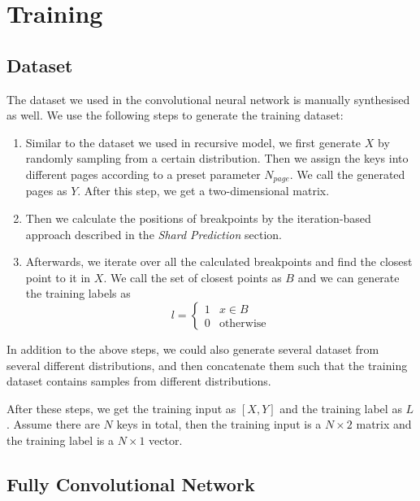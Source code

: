 \section{Training}

\subsection{Dataset}

The dataset we used in the convolutional neural network is manually synthesised as well. We use the following steps to generate the training dataset:

\begin{enumerate}
	\item Similar to the dataset we used in recursive model, we first generate $X$ by randomly sampling from a certain distribution. Then we assign the keys into different pages according to a preset parameter $N_{page}$. We call the generated pages as $Y$. After this step, we get a two-dimensional matrix.
	\item Then we calculate the positions of breakpoints by the iteration-based approach described in the \textit{Shard Prediction} section.
	\item Afterwards, we iterate over all the calculated breakpoints and find the closest point to it in $X$. We call the set of closest points as $B$ and we can generate the training labels as
	\begin{equation}
		l=\begin{cases}
			1 & x\in B \\
			0 & \text{otherwise} 
		\end{cases}
	\end{equation}
\end{enumerate}

In addition to the above steps, we could also generate several dataset from several different distributions, and then concatenate them such that the training dataset contains samples from different distributions.

After these steps, we get the training input as $[X, Y]$ and the training label as $L$. Assume there are $N$ keys in total, then the training input is a $N\times 2$ matrix and the training label is a $N\times 1$ vector.

\subsection{Fully Convolutional Network}

